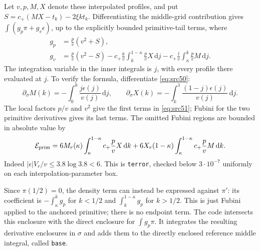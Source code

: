 \documentclass[11pt,a4paper]{article}
\numberwithin{equation}{section}
\theoremstyle{definition}
\theoremstyle{remark}
\newcommand{\dd}{\mathrm d}
\begin{document}
Let $v,p,M,X$ denote these interpolated profiles, and put
$S=c_+(MX-t_k)-2\xi kt_k$.  Differentiating the middle-grid
contribution gives $\int(g_p\pi+g_v\epsilon)$, up to the explicitly
bounded primitive-tail terms, where
\begin{equation}
 \begin{split}
 g_p&=\frac pv(v^2+S),\\
 g_v&=\frac pv(v^2-S)
 -c_+\frac{k}{v}\int_k^{1-\kappa}\frac pvX\,\dd j
 -c_+\frac{l}{v}\int_\kappa^k\frac pvM\,\dd j.
 \end{split}
 \label{eq:src51}
\end{equation}
The integration variable in the inner integrals is $j$, with every
profile there evaluated at $j$.  To verify the formula, differentiate
\eqref{eq:src50}:
\[
 \partial_\sigma M(k)=-\int_0^k\frac{j\epsilon(j)}{v(j)}\,\dd j,
 \qquad
 \partial_\sigma X(k)=-\int_k^1\frac{(1-j)\epsilon(j)}{v(j)}\,\dd j.
\]
The local factors $p/v$ and $v^2$ give the first terms in
\eqref{eq:src51}; Fubini for the two primitive derivatives gives its
last terms.  The omitted Fubini regions are bounded in absolute value
by
\[
 \mathcal E_{\rm prim}
 =6M_r(\kappa)\int_\kappa^{1-\kappa}c_+\frac pvX\,\dd k
 +6X_r(1-\kappa)\int_\kappa^{1-\kappa}c_+\frac pvM\,\dd k.
\]
Indeed $|\epsilon|V_r/v\le3.8\log3.8<6$.  This is
\texttt{terror}, checked below $3\cdot10^{-7}$ uniformly on each
interpolation-parameter box.

Since $\pi(1/2)=0$, the density term can instead be expressed against
$\pi'$: its coefficient is
$-\int_\kappa^k g_p$ for $k<1/2$ and
$\int_k^{1-\kappa}g_p$ for $k>1/2$.  This is just Fubini applied to
the anchored primitive; there is no endpoint term.  The code
intersects this enclosure with the direct enclosure for
$\int g_p\pi$.  It integrates the resulting derivative enclosures
in $\sigma$ and adds them to the directly enclosed reference middle
integral, called \texttt{base}.
\end{document}
